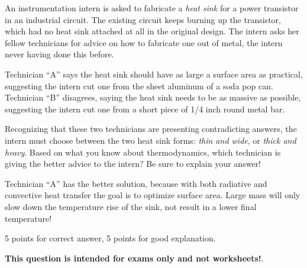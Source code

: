 

An instrumentation intern is asked to fabricate a {\it heat sink} for a power transistor in an industrial circuit.  The existing circuit keeps burning up the transistor, which had no heat sink attached at all in the original design.  The intern asks her fellow technicians for advice on how to fabricate one out of metal, the intern never having done this before.  

Technician ``A'' says the heat sink should have as large a surface area as practical, suggesting the intern cut one from the sheet aluminum of a soda pop can.  Technician ``B'' disagrees, saying the heat sink needs to be as massive as possible, suggesting the intern cut one from a short piece of 1/4 inch round metal bar.

\vskip 10pt

Recognizing that these two technicians are presenting contradicting answers, the intern must choose between the two heat sink forms: {\it thin and wide}, or {\it thick and heavy}.  Based on what you know about thermodynamics, which technician is giving the better advice to the intern?  Be sure to explain your answer!







Technician ``A'' has the better solution, because with both radiative and convective heat transfer the goal is to optimize surface area.  Large mass will only slow down the temperature rise of the sink, not result in a lower final temperature!

\vskip 10pt

5 points for correct answer, 5 points for good explanation.







{\bf This question is intended for exams only and not worksheets!}.


